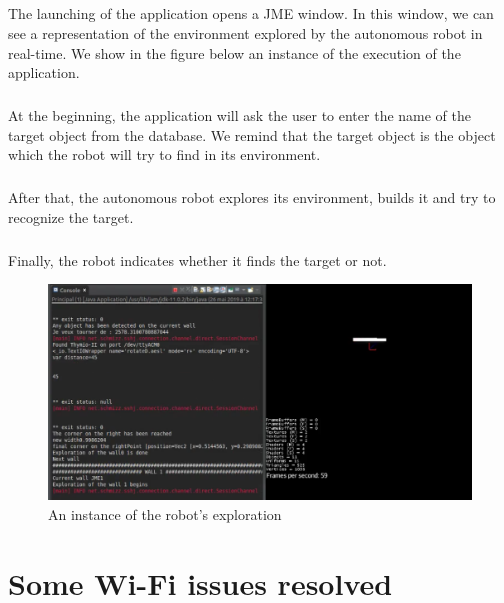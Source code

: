 \documentclass[12pt]{report}
\begin{document}
\paragraph{}
The launching of the application opens a JME window. In this window, we can see a representation of the environment explored by the autonomous robot in real-time. We show in the figure below an instance of the execution of the application.
\paragraph{}
At the beginning, the application will ask the user to enter the name of the target object from the database. We remind that the target object is the object which the robot will try to find in its environment. 

\paragraph{}
After that, the autonomous robot explores its environment, builds it and try to recognize the target. 

\paragraph{}
Finally, the robot indicates whether it finds the target or not.


\begin{figure}[H]
	\begin{center}
		\includegraphics[scale=0.35]{res/instanceApp.png}
		\caption{An instance of the robot's exploration}
	\end{center}
\end{figure}
\appendix 
	\chapter{Some Wi-Fi issues resolved}
\end{document}
